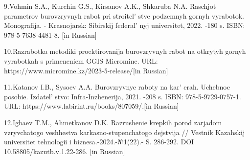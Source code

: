 \begin{references}
9.Vohmin S.A., Kurchin G.S., Kirsanov A.K., Shkaruba N.A. Raschjot
parametrov burovzryvnyh rabot pri stroitel' stve
podzemnyh gornyh vyrabotok. Monografija. - Krasnojarsk: Sibirskij
federal' nyj universitet, 2022. -180 s. ISBN: 978-5-7638-4481-8. {[}in Russian{]}

10.Razrabotka metodiki proektirovanija burovzryvnyh rabot na otkrytyh
gornyh vyrabotkah s primeneniem GGIS Micromine. URL: https://www.micromine.kz/2023-5-release/{[}in Russian{]}

11.Katanov I.B., Sysoev A.A. Burovzryvnye raboty na
kar' erah. Uchebnoe posobie.
Izdatel' stvo: Infra-Inzhenerija, 2021. -208 s. ISBN:
978-5-9729-0757-1. URL: https://www.labirint.ru/books/807059/.{[}in Russian{]}

12.Igbaev T.M., Ahmetkanov D.K. Razrushenie krepkih porod zarjadom
vzryvchatogo veshhestva karkasno-stupenchatogo dejstvija // Vestnik
Kazahskij universitet tehnologii i biznesa.-2024.-№1(22).- S. 286-292.
DOI 10.58805/kazutb.v.1.22-286. {[}in Russian{]}
\end{references}
